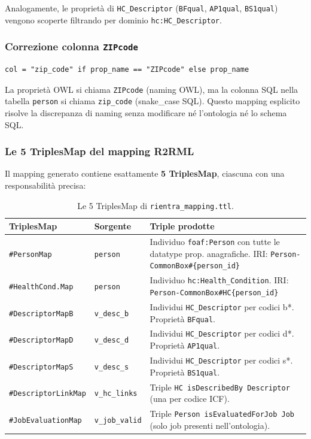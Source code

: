 \documentclass[a4paper,12pt]{article}
\begin{document}
Analogamente, le propriet\`{a} di \texttt{HC\_Descriptor} (\texttt{BFqual},
\texttt{AP1qual}, \texttt{BS1qual}) vengono scoperte filtrando per dominio
\texttt{hc:HC\_Descriptor}.

\subsubsection{Correzione colonna \texttt{ZIPcode}}

\begin{lstlisting}[caption={Alias colonna ZIPcode $\rightarrow$ zip\_code.}]
col = "zip_code" if prop_name == "ZIPcode" else prop_name
\end{lstlisting}

\noindent La propriet\`{a} OWL si chiama \texttt{ZIPcode} (naming OWL), ma la
colonna SQL nella tabella \texttt{person} si chiama \texttt{zip\_code}
(snake\_case SQL). Questo mapping esplicito risolve la discrepanza di
naming senza modificare n\'{e} l'ontologia n\'{e} lo schema SQL.

\subsubsection{Le 5 TriplesMap del mapping R2RML}

Il mapping generato contiene esattamente \textbf{5 TriplesMap},
ciascuna con una responsabilit\`{a} precisa:

\begin{table}[H]
\centering\small
\caption{Le 5 TriplesMap di \texttt{rientra\_mapping.ttl}.}
\begin{tabular}{L{3.5cm} L{3.5cm} L{5.5cm}}
\toprule
\textbf{TriplesMap} & \textbf{Sorgente} & \textbf{Triple prodotte} \\
\midrule
\texttt{\#PersonMap} &
  \texttt{person} &
  Individuo \texttt{foaf:Person} con tutte le datatype prop. anagrafiche.
  IRI: \texttt{Person-CommonBox\#\{person\_\allowbreak{}id\}} \\[4pt]
\texttt{\#HealthCond.\-Map} &
  \texttt{person} &
  Individuo \texttt{hc:Health\_Condition}.
  IRI: \texttt{Person-CommonBox\#HC\{person\_\allowbreak{}id\}} \\[4pt]
\texttt{\#DescriptorMapB} &
  \texttt{v\_desc\_b} &
  Individui \texttt{HC\_Descriptor} per codici b*.
  Propriet\`{a} \texttt{BFqual}. \\[4pt]
\texttt{\#DescriptorMapD} &
  \texttt{v\_desc\_d} &
  Individui \texttt{HC\_Descriptor} per codici d*.
  Propriet\`{a} \texttt{AP1qual}. \\[4pt]
\texttt{\#DescriptorMapS} &
  \texttt{v\_desc\_s} &
  Individui \texttt{HC\_Descriptor} per codici s*.
  Propriet\`{a} \texttt{BS1qual}. \\[4pt]
\texttt{\#DescriptorLinkMap} &
  \texttt{v\_hc\_links} &
  Triple \texttt{HC isDescribedBy Descriptor} (una per codice ICF). \\[4pt]
\texttt{\#JobEvaluationMap} &
  \texttt{v\_job\_valid} &
  Triple \texttt{Person isEvaluatedForJob Job}
  (solo job presenti nell'ontologia). \\
\bottomrule
\end{tabular}
\end{table}
\end{document}
